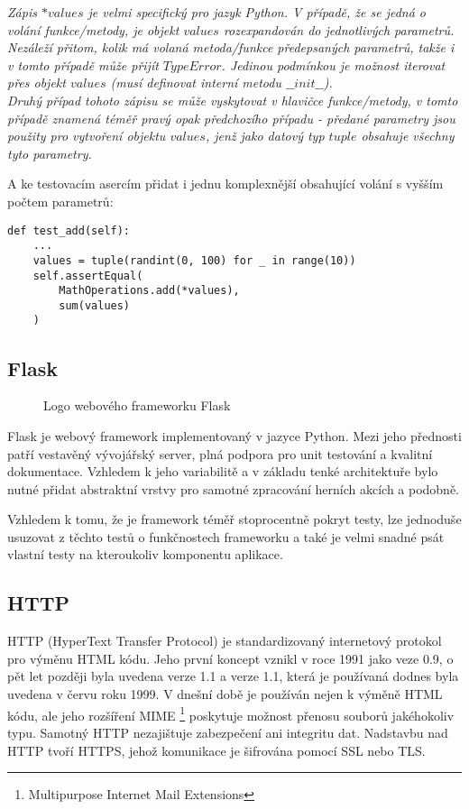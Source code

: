 \textit{
  Zápis $*values$ je velmi specifický pro jazyk Python. V případě, že se jedná o volání funkce/metody, je objekt $values$ rozexpandován do jednotlivých parametrů. Nezáleží přitom, kolik má volaná metoda/funkce předepsaných parametrů, takže i v tomto případě může přijít $TypeError$. Jedinou podmínkou je možnost iterovat přes objekt $values$ (musí definovat interní metodu $\_\_init\_\_$). \\Druhý případ tohoto zápisu se může vyskytovat v hlavičce funkce/metody, v tomto případě znamená téměř pravý opak předchozího případu - předané parametry jsou použity pro vytvoření objektu $values$, jenž jako datový typ $tuple$ obsahuje všechny tyto parametry. 
}

A ke testovacím asercím přidat i jednu komplexnější obsahující volání s vyšším počtem parametrů:

\begin{lstlisting}[caption={Finální test pro metodu $MathOperations.add$}]
def test_add(self):
	...
	values = tuple(randint(0, 100) for _ in range(10))
	self.assertEqual(
		MathOperations.add(*values),
		sum(values)
	)

\end{lstlisting}

\subsection{Flask}
\label{subsec:flask}
\begin{wrapfigure}{R}{\textwidth/3}
    \centering
    
    \caption{Logo webového frameworku Flask}
\end{wrapfigure}

Flask je webový framework implementovaný v jazyce Python. Mezi jeho přednosti patří vestavěný vývojářský server, plná podpora pro unit testování a kvalitní dokumentace. Vzhledem k jeho variabilitě a v základu tenké architektuře bylo nutné přidat abstraktní vrstvy pro samotné zpracování herních akcích a podobně.

Vzhledem k tomu, že je framework téměř stoprocentně pokryt testy, lze jednoduše usuzovat z těchto testů o funkčnostech frameworku a také je velmi snadné psát vlastní testy na kteroukoliv komponentu aplikace.

\subsection{HTTP}
\label{subsec:http}
HTTP (HyperText Transfer Protocol) je standardizovaný internetový protokol pro výměnu HTML kódu. Jeho první koncept vznikl v roce 1991 jako veze 0.9, o pět let později byla uvedena verze 1.1 a verze 1.1, která je používaná dodnes byla uvedena v červu roku 1999. V dnešní době je používán nejen k výměně HTML kódu, ale jeho rozšíření MIME \footnote{Multipurpose Internet Mail Extensions} poskytuje možnost přenosu souborů jakéhokoliv typu. Samotný HTTP nezajištuje zabezpečení ani integritu dat. Nadstavbu nad HTTP tvoří HTTPS, jehož komunikace je šifrována pomocí SSL nebo TLS.

